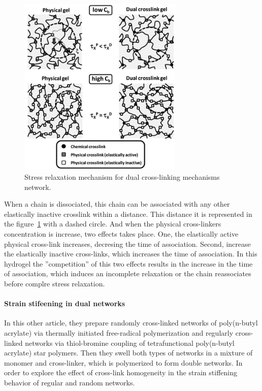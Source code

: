 \begin{figure}[ht!]
    \centering
    \includegraphics[width=0.7\textwidth]{figs/explainMechResponse/dualNetwork1.png}
    \caption{Stress relaxation mechanism for dual cross-linking mechanisms network\citep{naritaViscoelasticPropertiesPolyvinyl2013}.}\label{fig:hydroMechResponse1}
\end{figure}

When a chain is dissociated, this chain can be associated with any other elastically inactive crosslink within a distance.
This distance it is represented in the figure~\ref{fig:hydroMechResponse1} with a dashed circle.
And when the physical cross-linkers concentration is increase, two effects takes place.
One, the elastically active physical cross-link increases, decresing the time of association.
Second, increase the elastically inactive cross-links, which increases the time of association.
In this hydrogel the ''competition'' of this two effects results in the increase in the time of association, which induces an incomplete relaxation or the chain reassociates before complre stress relaxation.

\paragraph{Strain stifeening in dual networks}
In this other article\citep{kongEffectCrossLinkHomogeneity2024}, they prepare randomly cross-linked networks of poly(n-butyl acrylate) via thermally initiated free-radical polymerization and regularly cross-linked networks via thiol-bromine coupling of tetrafunctional poly(n-butyl acrylate) star polymers. 
Then they swell both types of networks in a mixture of monomer and cross-linker, which is polymerized to form double networks.
In order to explore the effect of cross-link homogeneity in the strain stiffening behavior of regular and random networks.


